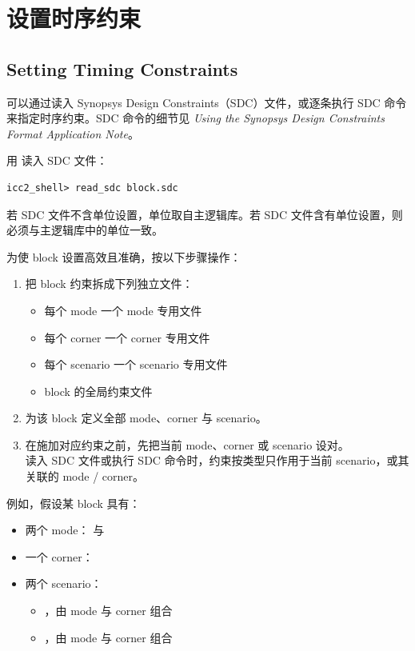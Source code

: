 \section{设置时序约束}
\subsection*{Setting Timing Constraints}

可以通过读入 Synopsys Design Constraints（SDC）文件，或逐条执行 SDC 命令来指定时序约束。SDC 命令的细节见 \textit{Using the Synopsys Design Constraints Format Application Note}。

用  读入 SDC 文件：
\begin{lstlisting}
icc2_shell> read_sdc block.sdc
\end{lstlisting}

\begin{noteBox}
若 SDC 文件不含单位设置，单位取自主逻辑库。若 SDC 文件含有单位设置，则必须与主逻辑库中的单位一致。
\end{noteBox}

为使 block 设置高效且准确，按以下步骤操作：
\begin{enumerate}
  \item 把 block 约束拆成下列独立文件：
  \begin{itemize}
    \item 每个 mode 一个 mode 专用文件
    \item 每个 corner 一个 corner 专用文件
    \item 每个 scenario 一个 scenario 专用文件
    \item block 的全局约束文件
  \end{itemize}
  \item 为该 block 定义全部 mode、corner 与 scenario。
  \item 在施加对应约束之前，先把当前 mode、corner 或 scenario 设对。\\
        读入 SDC 文件或执行 SDC 命令时，约束按类型只作用于当前 scenario，或其关联的 mode / corner。
\end{enumerate}

例如，假设某 block 具有：
\begin{itemize}
  \item 两个 mode： 与 
  \item 一个 corner：
  \item 两个 scenario：
  \begin{itemize}
    \item {}，由 mode  与 corner  组合
    \item {}，由 mode  与 corner  组合
  \end{itemize}
\end{itemize}

